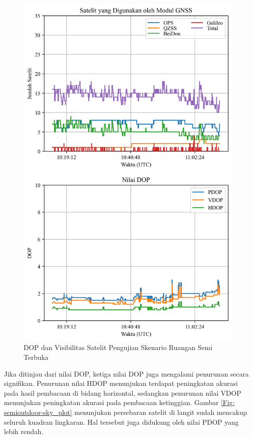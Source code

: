 \begin{figure}[H]
	\centering
	\captionsetup{justification=centering}
	\includegraphics[width=11.5cm]{contents/chapter-4/3-skenario-semioutdoor/sats_dop.png}
	\caption{DOP dan Visibilitas Satelit Pengujian Skenario Ruangan Semi Terbuka}
	\label{Fig: semioutdoor-sats_dop}
\end{figure}

Jika ditinjau dari nilai DOP, ketiga nilai DOP juga mengalami penurunan secara signifikan. Penurunan nilai HDOP menunjukan terdapat peningkatan akurasi pada hasil pembacaan di bidang horizontal, sedangkan penurunan nilai VDOP menunjukan peningkatan akurasi pada pembacaan ketinggian. Gambar \ref{Fig: semioutdoor-sky_plot} menunjukan persebaran satelit di langit sudah mencakup seluruh kuadran lingkaran. Hal tersebut juga didukung oleh nilai PDOP yang lebih rendah.

